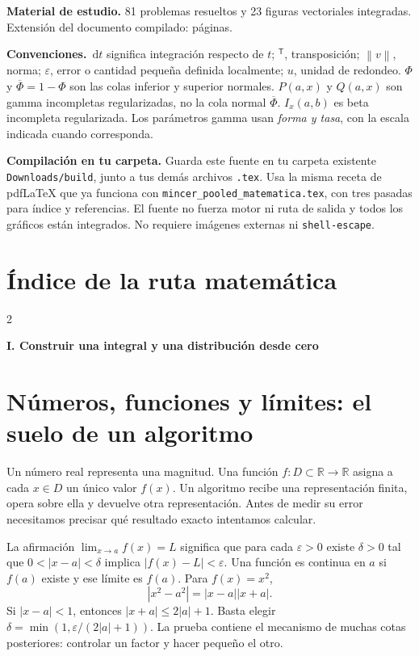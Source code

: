 \documentclass[11pt,a4paper]{article}
\newcommand{\R}{\mathbb R}
\newcommand{\dd}{\,\mathrm d}
\newcommand{\T}{^{\mathsf T}}
\newcommand{\norm}[1]{\left\lVert #1\right\rVert}
\theoremstyle{definition}
\newcommand{\parte}[1]{\par\bigskip\Needspace{8\baselineskip}\begin{center}{\Large\bfseries\color{azul}#1}\end{center}}
\newcommand{\eps}{\varepsilon}
\newcommand{\Q}{\overline\Phi}
\newcounter{problema}
\begin{document}
\textbf{Material de estudio.} 81 problemas resueltos y 23 figuras vectoriales integradas. Extensión del documento compilado: \pageref{ultima-pagina} páginas.

\textbf{Convenciones.} $\dd t$ significa integración respecto de $t$; $\T$, transposición; $\norm{v}$, norma; $\eps$, error o cantidad pequeña definida localmente; $u$, unidad de redondeo. $\Phi$ y $\Q=1-\Phi$ son las colas inferior y superior normales. $P(a,x)$ y $Q(a,x)$ son gamma incompletas regularizadas, no la cola normal $\Q$. $I_x(a,b)$ es beta incompleta regularizada. Los parámetros gamma usan \emph{forma y tasa}, con la escala indicada cuando corresponda.

\textbf{Compilación en tu carpeta.} Guarda este fuente en tu carpeta existente \texttt{Downloads/build}, junto a tus demás archivos \texttt{.tex}. Usa la misma receta de pdfLaTeX que ya funciona con \texttt{mincer\_pooled\_matematica.tex}, con tres pasadas para índice y referencias. El fuente no fuerza motor ni ruta de salida y todos los gráficos están integrados. No requiere imágenes externas ni \texttt{shell-escape}.

\setcounter{tocdepth}{1}
\section*{Índice de la ruta matemática}
\begin{multicols}{2}\footnotesize\setlength{\parskip}{0pt}
\makeatletter
\renewcommand*\l@section[2]{\@dottedtocline{1}{0pt}{2.5em}{#1}{#2}}
\makeatother
\end{multicols}

\parte{I. Construir una integral y una distribución desde cero}
\section{Números, funciones y límites: el suelo de un algoritmo}
Un número real representa una magnitud. Una función $f:D\subset\R\to\R$ asigna a cada $x\in D$ un único valor $f(x)$. Un algoritmo recibe una representación finita, opera sobre ella y devuelve otra representación. Antes de medir su error necesitamos precisar qué resultado exacto intentamos calcular.

La afirmación $\lim_{x\to a}f(x)=L$ significa que para cada $\eps>0$ existe $\delta>0$ tal que $0<|x-a|<\delta$ implica $|f(x)-L|<\eps$. Una función es continua en $a$ si $f(a)$ existe y ese límite es $f(a)$. Para $f(x)=x^2$,
\[
|x^2-a^2|=|x-a||x+a|.
\]
Si $|x-a|<1$, entonces $|x+a|\le2|a|+1$. Basta elegir $\delta=\min(1,\eps/(2|a|+1))$. La prueba contiene el mecanismo de muchas cotas posteriores: controlar un factor y hacer pequeño el otro.
\end{document}
